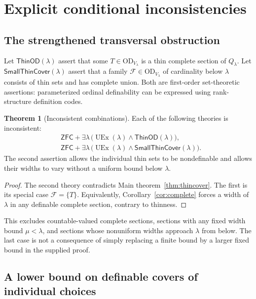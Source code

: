 \documentclass[11pt,letterpaper]{article}
\theoremstyle{definition}
\newtheorem{theorem}[definition]{Theorem}
\numberwithin{equation}{section}
\newcommand{\ZFC}{\mathsf{ZFC}}
\newcommand{\OD}{\mathrm{OD}}
\newcommand{\UEx}{\operatorname{UEx}}
\newcommand{\FF}{\mathcal F}
\begin{document}
\section{Explicit conditional inconsistencies}\label{sec:inconsistency}

\subsection{The strengthened transversal obstruction}

Let $\mathsf{ThinOD}(\lambda)$ assert that some $T\in\OD_{V_\lambda}$ is a thin complete section of $Q_\lambda$. Let $\mathsf{SmallThinCover}(\lambda)$ assert that a family $\FF\in\OD_{V_\lambda}$ of cardinality below $\lambda$ consists of thin sets and has complete union. Both are first-order set-theoretic assertions: parameterized ordinal definability can be expressed using rank-structure definition codes.

\begin{theorem}[Inconsistent combinations]\label{thm:inconsistent}
Each of the following theories is inconsistent:
\begin{align*}
 &\ZFC+\exists\lambda\,\bigl(\UEx(\lambda)\wedge\mathsf{ThinOD}(\lambda)\bigr),\\
 &\ZFC+\exists\lambda\,\bigl(\UEx(\lambda)\wedge\mathsf{SmallThinCover}(\lambda)\bigr).
\end{align*}
The second assertion allows the individual thin sets to be nondefinable and allows their widths to vary without a uniform bound below $\lambda$.
\end{theorem}

\begin{proof}
The second theory contradicts Main theorem~\ref{thm:thincover}. The first is its special case $\FF=\{T\}$. Equivalently, Corollary~\ref{cor:complete} forces a width of $\lambda$ in any definable complete section, contrary to thinness.
\end{proof}

This excludes countable-valued complete sections, sections with any fixed width bound $\mu<\lambda$, and sections whose nonuniform widths approach $\lambda$ from below. The last case is not a consequence of simply replacing a finite bound by a larger fixed bound in the supplied proof.

\subsection{A lower bound on definable covers of individual choices}
\end{document}
